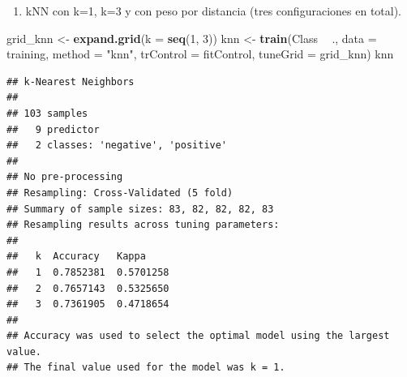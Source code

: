 \documentclass[]{article}
\newenvironment{Shaded}{\begin{snugshade}}{\end{snugshade}}
\newcommand{\DataTypeTok}[1]{\textcolor[rgb]{0.13,0.29,0.53}{#1}}
\newcommand{\DecValTok}[1]{\textcolor[rgb]{0.00,0.00,0.81}{#1}}
\newcommand{\KeywordTok}[1]{\textcolor[rgb]{0.13,0.29,0.53}{\textbf{#1}}}
\newcommand{\NormalTok}[1]{#1}
\newcommand{\OperatorTok}[1]{\textcolor[rgb]{0.81,0.36,0.00}{\textbf{#1}}}
\newcommand{\StringTok}[1]{\textcolor[rgb]{0.31,0.60,0.02}{#1}}
\providecommand{\tightlist}{%
  \setlength{\itemsep}{0pt}\setlength{\parskip}{0pt}}
\begin{document}
\begin{enumerate}
\def\labelenumi{\arabic{enumi}.}
\setcounter{enumi}{1}
\tightlist
\item
  kNN con k=1, k=3 y con peso por distancia (tres configuraciones en total).
\end{enumerate}

\begin{Shaded}
\begin{Highlighting}[]
\NormalTok{grid_knn <-}\StringTok{ }\KeywordTok{expand.grid}\NormalTok{(}\DataTypeTok{k =} \KeywordTok{seq}\NormalTok{(}\DecValTok{1}\NormalTok{, }\DecValTok{3}\NormalTok{))}
\NormalTok{knn <-}\StringTok{ }\KeywordTok{train}\NormalTok{(Class }\OperatorTok{~}\StringTok{ }\NormalTok{., }\DataTypeTok{data =}\NormalTok{ training, }\DataTypeTok{method =} \StringTok{"knn"}\NormalTok{, }\DataTypeTok{trControl =}\NormalTok{ fitControl, }\DataTypeTok{tuneGrid =}\NormalTok{ grid_knn)}
\NormalTok{knn}
\end{Highlighting}
\end{Shaded}

\begin{verbatim}
## k-Nearest Neighbors 
## 
## 103 samples
##   9 predictor
##   2 classes: 'negative', 'positive' 
## 
## No pre-processing
## Resampling: Cross-Validated (5 fold) 
## Summary of sample sizes: 83, 82, 82, 82, 83 
## Resampling results across tuning parameters:
## 
##   k  Accuracy   Kappa    
##   1  0.7852381  0.5701258
##   2  0.7657143  0.5325650
##   3  0.7361905  0.4718654
## 
## Accuracy was used to select the optimal model using the largest value.
## The final value used for the model was k = 1.
\end{verbatim}

\begin{Shaded}
\end{Shaded}
\end{document}
